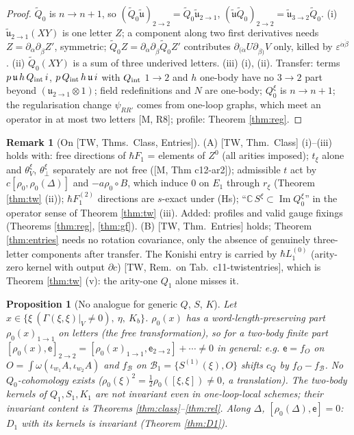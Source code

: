 \documentclass[10pt]{article}
\newtheorem{proposition}[theorem]{Proposition}
\theoremstyle{definition}
\newtheorem{remark}[theorem]{Remark}
\newcommand{\ee}{\mathsf e}
\begin{document}
\begin{proof}
$\tilde Q_0$ is $n\to n+1$, so $(\tilde Q_0\tilde{\mathfrak u})_{2\to2}=\tilde Q_0\tilde{\mathfrak u}_{2\to1}$, $(\tilde{\mathfrak u}\tilde Q_0)_{2\to2}=\tilde{\mathfrak u}_{3\to2}\tilde Q_0$. (i) $\tilde{\mathfrak u}_{2\to1}(XY)$ is one letter $Z$; a component along two first derivatives needs $Z=\partial_{\dot\alpha}\partial_{\dot\beta}Z'$, symmetric; $\tilde Q_0Z=\partial_{\dot\alpha}\partial_{\dot\beta}\tilde Q_0Z'$ contributes $\partial_{(\dot\alpha}U\partial_{\dot\beta)}V$ only, killed by $\varepsilon^{\dot\alpha\dot\beta}$. (ii) $\tilde Q_0(XY)$ is a sum of three underived letters. (iii) (i), (ii). Transfer: terms $p\,\mathfrak u\,h\,Q_{\rm int}\,i$, $p\,Q_{\rm int}\,h\,\mathfrak u\,i$ with $Q_{\rm int}$ $1\to2$ and $h$ one-body have no $3\to2$ part beyond $(\mathfrak u_{2\to1}\otimes1)$; field redefinitions and $N$ are one-body; $Q^\xi_0$ is $n\to n+1$; the regularisation change $\psi_{RR'}$ comes from one-loop graphs, which meet an operator in at most two letters [M, R8]; profile: Theorem \ref{thm:reg}.
\end{proof}

\begin{remark}[On {[TW, Thms.~Class, Entries]}]\label{rem:tw}
(A) [TW, Thm.~Class] (i)--(iii) holds with: free directions of $\hbar F_1$ = elements of $Z^0$ (all arities imposed); $t_\xi$ alone and $\theta^\xi_V$, $\theta^\xi_\perp$ separately are not free ([M, Thm c12-ar2]); admissible $t$ act by $c[\rho_0,\rho_0(\Delta)]$ and $-a\rho_0\circ B$, which induce $0$ on $E_1$ through $r_\xi$ (Theorem \ref{thm:tw} (ii)); $\hbar F_1^{(2)}$ directions are $s$-exact under (Hs); ``$\mathbb C\,S^\xi\subset\operatorname{Im}Q^\xi_0$'' in the operator sense of Theorem \ref{thm:tw} (iii). Added: profiles and valid gauge fixings (Theorems \ref{thm:reg}, \ref{thm:gf}). (B) [TW, Thm.~Entries] holds; Theorem \ref{thm:entries} needs no rotation covariance, only the absence of genuinely three-letter components after transfer. The Konishi entry is carried by $\hbar L_1^{(0)}$ (arity-zero kernel with output $\partial c$) [TW, Rem.~on Tab.~c11-twistentries], which is Theorem \ref{thm:tw} (v): the arity-one $Q_1$ alone misses it.
\end{remark}

\begin{proposition}[No analogue for generic $Q$, $S$, $K$]\label{prop:contrast}
Let $x\in\{\xi\ (\Gamma(\xi,\xi)|_V\ne0),\ \eta,\ K_b\}$. $\rho_0(x)$ has a word-length-preserving part $\rho_0(x)_{1\to1}$ on letters (the free transformation), so for a two-body finite part $[\rho_0(x),\ee]_{2\to2}=[\rho_0(x)_{1\to1},\ee_{2\to2}]+\cdots\ne0$ in general: e.g. $\ee=f_O$ on $O=\int\omega(\iota_{w_1}A,\iota_{w_2}A)$ and $f_{\mathcal B}$ on $\mathcal B_1=\{S^{(1)}(\xi),O\}$ shifts $c_Q$ by $f_O-f_{\mathcal B}$. No $Q_0$-cohomology exists ($\rho_0(\xi)^2=\tfrac12\rho_0([\xi,\xi])\ne0$, a translation). The two-body kernels of $Q_1,S_1,K_1$ are not invariant even in one-loop-local schemes; their invariant content is Theorems \ref{thm:class}--\ref{thm:rel}. Along $\Delta$, $[\rho_0(\Delta),\ee]=0$: $D_1$ with its kernels is invariant (Theorem \ref{thm:D1}).
\end{proposition}
\end{document}
